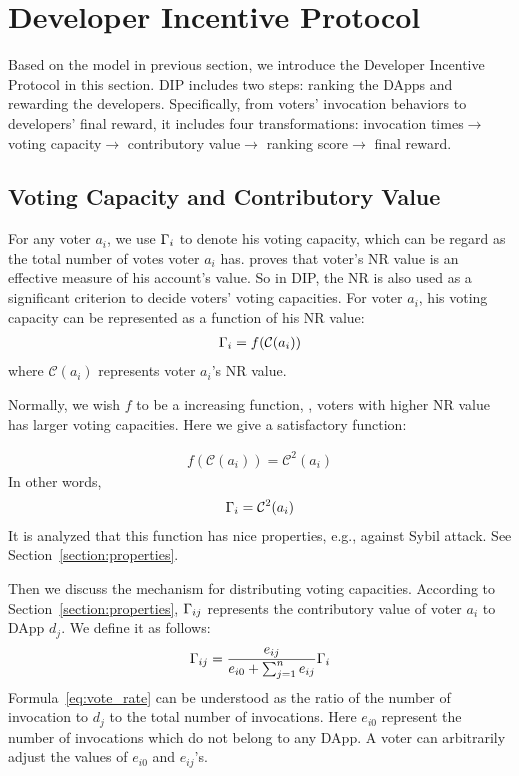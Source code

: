 \section{Developer Incentive Protocol}
\noindent Based on the model in previous section, we introduce the Developer
Incentive Protocol in this section. DIP includes two steps: ranking the DApps
and rewarding the developers. Specifically, from voters' invocation behaviors
to developers' final reward, it includes four transformations: invocation
times$\rightarrow$ voting capacity$\rightarrow$ contributory
value$\rightarrow$ ranking score$\rightarrow$ final reward.

\subsection{Voting Capacity and Contributory Value}
\noindent For any voter $a_i$, we use $\Gamma_i$ to denote his voting capacity, which can be regard as the total number of votes voter $a_i$ has. \cite{Nebulasyellowpaper} proves that voter's NR value is an effective measure of his account's value. So in DIP, the NR is also used as a significant criterion to decide voters' voting capacities. For voter $a_i$, his voting capacity can be represented as a function of his NR value:
\begin{align}
	\Gamma_i = f(\mathcal{C}(a_i))
\end{align}
where $\mathcal{C}(a_i)$ represents voter $a_i$'s NR value.


Normally, we wish $f$ to be a increasing function, \ie, voters with higher NR value has larger voting capacities. Here we give a satisfactory function:

\begin{align}
	f(\mathcal{C}(a_i))=\mathcal{C}^2(a_i)
\end{align}
In other words,
\begin{align}
	\Gamma_i = \mathcal{C}^2(a_i)
\end{align}
It is analyzed that this function has nice properties, e.g., against Sybil attack. See Section~\ref{section:properties}.

Then we discuss the mechanism for  distributing voting capacities. According to Section~\ref{section:properties}, $\Gamma_{ij}$ represents the contributory value of voter $a_i$ to DApp $d_j$. We define it as follows:
\begin{align}
	\label{eq:vote_rate}
	\Gamma_{ij} = \frac{e_{ij}}{e_{i0}+\sum_{j=1}^n {e_{ij}}} \Gamma_i
\end{align}
Formula~\ref{eq:vote_rate} can be understood as the ratio of the number of invocation to $d_j$ to the total number of invocations. Here $e_{i0}$ represent the number of invocations which do not belong to any DApp. A voter can arbitrarily adjust the values of $e_{i0}$ and $e_{ij}$'s.

